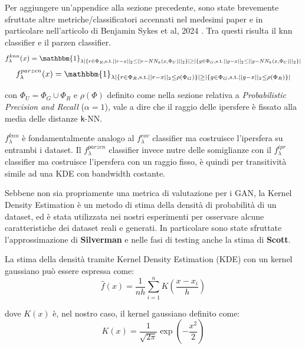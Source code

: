 Per aggiungere un'appendice alla sezione precedente, sono state brevemente sfruttate altre metriche/classificatori accennati nel medesimi paper e in particolare nell'articolo di Benjamin Sykes et al, 2024 \cite{6UnifyingPrecisionRecall}. 
Tra questi risulta il knn classifier e il parzen classifier.
\begin{equation}
    f_{\lambda}^{knn}(x) = \mathbbm{1}_{\lambda |\{ r \in \Phi_R, \text{s.t.} ||r - x||_2 \leq ||r - NN_k(x, \Phi_U)||_2 \}| \geq |\{ g \in \Phi_G, \text{s.t.} ||g - x||_2 \leq ||g - NN_k(x, \Phi_U)||_2 \}|}
\end{equation}
\begin{equation}
    f_{\lambda}^{parzen}(x) = \mathbbm{1}_{\lambda |\{ r \in \Phi_R, \text{s.t.} ||r - x||_2 \leq \rho(\Phi_G) \}| \geq |\{ g \in \Phi_G, \text{s.t.} ||g - x||_2 \leq \rho(\Phi_R) \}|}
\end{equation}

con \(\Phi_U = \Phi_G \cup \Phi_R \) e \(\rho(\Phi)\) definito come nella sezione relativa a \textit{Probabilistic Precision and Recall} (\(\alpha = 1\)), vale a dire che il raggio delle ipersfere è fissato alla media delle distanze \texttt{k}-NN.

\(f_{\lambda}^{knn}\) è fondamentalmente analogo al \(f_{\lambda}^{cov}\) classifier ma costruisce l'ipersfera su entrambi i dataset.
Il \(f_{\lambda}^{parzen}\) classifier invece nutre delle somiglianze con il \(f_{\lambda}^{ipr}\) classifier ma costruisce l'ipersfera con un raggio fisso, è quindi per transitività simile ad una KDE con bandwidth costante.

Sebbene non sia propriamente una metrica di valutazione per i GAN, la Kernel Density Estimation è un metodo di stima della densità di probabilità di un dataset, ed è stata utilizzata nei nostri esperimenti per osservare alcune caratteristiche dei dataset reali e generati.
In particolare sono state sfruttate l'approssimazione di \textbf{Silverman} e nelle fasi di testing anche la stima di \textbf{Scott}.

La stima della densità tramite Kernel Density Estimation (KDE) con un kernel gaussiano può essere espressa come:
\begin{equation}
    \hat{f}(x) = \frac{1}{n h} \sum_{i=1}^{n} K\left(\frac{x - x_i}{h}\right)
\end{equation}

dove \(K(x)\) è, nel nostro caso, il kernel gaussiano definito come:
\begin{equation}
    K(x) = \frac{1}{\sqrt{2\pi}} \exp\left(-\frac{x^2}{2}\right)
\end{equation}

